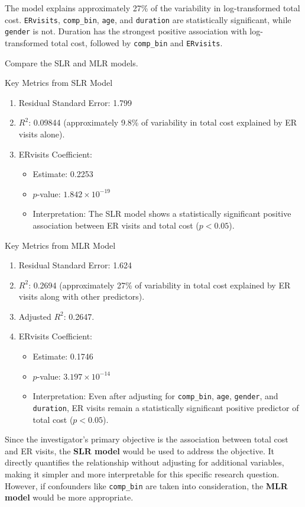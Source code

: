 \documentclass[
]{article}
\providecommand{\tightlist}{%
  \setlength{\itemsep}{0pt}\setlength{\parskip}{0pt}}
\begin{document}
The model explains approximately 27\% of the variability in
log-transformed total cost. \texttt{ERvisits}, \texttt{comp\_bin},
\texttt{age}, and \texttt{duration} are statistically significant, while
\texttt{gender} is not. Duration has the strongest positive association
with log-transformed total cost, followed by \texttt{comp\_bin} and
\texttt{ERvisits}.

Compare the SLR and MLR models.

Key Metrics from SLR Model

\begin{enumerate}
\def\labelenumi{\arabic{enumi}.}
\item
  Residual Standard Error: 1.799
\item
  \(R^2\): 0.09844 (approximately 9.8\% of variability in total cost
  explained by ER visits alone).
\item
  ERvisits Coefficient:

  \begin{itemize}
  \tightlist
  \item
    Estimate: 0.2253
  \item
    \(p\)-value: \ensuremath{1.842\times 10^{-19}}
  \item
    Interpretation: The SLR model shows a statistically significant
    positive association between ER visits and total cost
    (\(p < 0.05\)).
  \end{itemize}
\end{enumerate}

Key Metrics from MLR Model

\begin{enumerate}
\def\labelenumi{\arabic{enumi}.}
\item
  Residual Standard Error: 1.624
\item
  \(R^2\): 0.2694 (approximately 27\% of variability in total cost
  explained by ER visits along with other predictors).
\item
  Adjusted \(R^2\): 0.2647.
\item
  ERvisits Coefficient:

  \begin{itemize}
  \tightlist
  \item
    Estimate: 0.1746
  \item
    \(p\)-value: \ensuremath{3.197\times 10^{-14}}
  \item
    Interpretation: Even after adjusting for \texttt{comp\_bin},
    \texttt{age}, \texttt{gender}, and \texttt{duration}, ER visits
    remain a statistically significant positive predictor of total cost
    (\(p < 0.05\)).
  \end{itemize}
\end{enumerate}

Since the investigator's primary objective is the association between
total cost and ER visits, the \textbf{SLR model} would be used to
address the objective. It directly quantifies the relationship without
adjusting for additional variables, making it simpler and more
interpretable for this specific research question. However, if
confounders like \texttt{comp\_bin} are taken into consideration, the
\textbf{MLR model} would be more appropriate.
\end{document}
